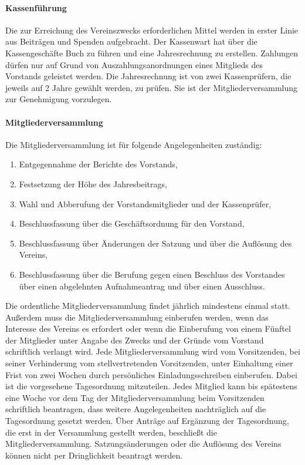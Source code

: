 \begin{multicols}{2}
\paragraph{Kassenführung}
Die zur Erreichung des Vereinszwecks erforderlichen Mittel werden in
erster Linie aus Beiträgen und Spenden aufgebracht. Der Kassenwart hat
über die Kassengeschäfte Buch zu führen und eine Jahresrechnung zu
erstellen. Zahlungen dürfen nur auf Grund von Auszahlungsanordnungen
eines Mitglieds des Vorstands geleistet werden. Die Jahresrechnung ist von
zwei Kassenprüfern, die jeweils auf 2 Jahre gewählt werden, zu prüfen. Sie
ist der Mitgliederversammlung zur Genehmigung vorzulegen.

\paragraph{Mitgliederversammlung}
Die Mitgliederversammlung ist für folgende Angelegenheiten zuständig:
\begin{enumerate}
\setlength{\itemsep}{-2pt}
\item Entgegennahme der Berichte des Vorstands,
\item Festsetzung der Höhe des Jahresbeitrags,
\item Wahl und Abberufung der Vorstandsmitglieder und der Kassenprüfer,
\item Beschlussfassung über die Geschäftsordnung für den Vorstand,
\item Beschlussfassung über Änderungen der Satzung und über die Auflösung
des Vereins,
\item Beschlussfassung über die Berufung gegen einen Beschluss des
Vorstandes über einen abgelehnten Aufnahmeantrag und über einen
Ausschluss.
\end{enumerate}
Die ordentliche Mitgliederversammlung findet jährlich mindestens einmal
statt. Außerdem muss die Mitgliederversammlung einberufen werden, wenn
das Interesse des Vereins es erfordert oder wenn die Einberufung von
einem Fünftel der Mitglieder unter Angabe des Zwecks und der Gründe
vom Vorstand schriftlich verlangt wird. Jede Mitgliederversammlung wird
vom Vorsitzenden, bei seiner Verhinderung vom stellvertretenden
Vorsitzenden, unter Einhaltung einer Frist von zwei Wochen durch
persönliches Einladungsschreiben einberufen. Dabei ist die vorgesehene
Tagesordnung mitzuteilen. Jedes Mitglied kann bis spätestens eine Woche
vor dem Tag der Mitgliederversammlung beim Vorsitzenden schriftlich
beantragen, dass weitere Angelegenheiten nachträglich auf die
Tagesordnung gesetzt werden. Über Anträge auf Ergänzung der
Tagesordnung, die erst in der Versammlung gestellt werden, beschließt die
Mitgliederversammlung. Satzungsänderungen oder die Auflösung des
Vereins können nicht per Dringlichkeit beantragt werden.


\end{multicols}
